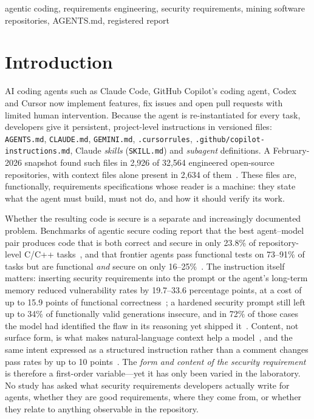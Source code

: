 \documentclass[10pt,conference]{IEEEtran}
\begin{document}
\begin{IEEEkeywords}
agentic coding, requirements engineering, security requirements, mining software repositories, AGENTS.md, registered report
\end{IEEEkeywords}

\section{Introduction}

AI coding agents such as Claude Code, GitHub Copilot's coding agent, Codex and Cursor now implement features, fix issues and open pull requests with limited human intervention. Because the agent is re-instantiated for every task, developers give it persistent, project-level instructions in versioned files: \texttt{AGENTS.md}, \texttt{CLAUDE.md}, \texttt{GEMINI.md}, \texttt{.cursorrules}, \texttt{.github/copilot-instructions.md}, Claude \emph{skills} (\texttt{SKILL.md}) and \emph{subagent} definitions. A February-2026 snapshot found such files in 2,926 of 32,564 engineered open-source repositories, with context files alone present in 2,634 of them~\cite{galster2026configuring}. These files are, functionally, requirements specifications whose reader is a machine: they state what the agent must build, must not do, and how it should verify its work.

Whether the resulting code is secure is a separate and increasingly documented problem. Benchmarks of agentic secure coding report that the best agent--model pair produces code that is both correct and secure in only 23.8\% of repository-level C/C++ tasks~\cite{chen2026securevibebench}, and that frontier agents pass functional tests on 73--91\% of tasks but are functional \emph{and} secure on only 16--25\%~\cite{wu2026lastsecure}. The instruction itself matters: inserting security requirements into the prompt or the agent's long-term memory reduced vulnerability rates by 19.7--33.6 percentage points, at a cost of up to 15.9 points of functional correctness~\cite{chen2026memory}; a hardened security prompt still left up to 34\% of functionally valid generations insecure, and in 72\% of those cases the model had identified the flaw in its reasoning yet shipped it~\cite{han2026secreason}. Content, not surface form, is what makes natural-language context help a model~\cite{pan2026comments}, and the same intent expressed as a structured instruction rather than a comment changes pass rates by up to 10 points~\cite{sun2026ifim}. The \emph{form and content of the security requirement} is therefore a first-order variable---yet it has only been varied in the laboratory. No study has asked what security requirements developers actually write for agents, whether they are good requirements, where they come from, or whether they relate to anything observable in the repository.
\end{document}
